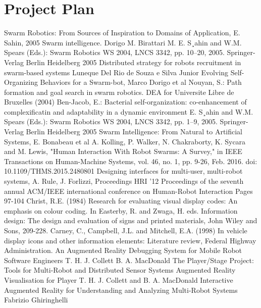 \documentclass[titlepage,hidelinks,10pt]{article}
\begin{document}
\section{Project Plan}
\begin{thebibliography}{1}
 Swarm Robotics: From Sources of
Inspiration to Domains of Application, E. Sahin, 2005
 Swarm intelligence. Dorigo M. Birattari M.
 E. S¸ahin and W.M. Spears (Eds.): Swarm Robotics WS 2004, LNCS 3342, pp. 10–20, 2005. Springer-Verlag Berlin Heidelberg 2005
 Distributed strategy for robots recruitment in swarm-based systems Luneque Del Rio de Souza e Silva Junior
 Evolving Self-Organizing Behaviors for a Swarm-bot, Marco Dorigo et al
 Nouyan, S.: Path formation and goal search in swarm robotics. DEA for Universite Libre de Bruxelles (2004)
 Ben-Jacob, E.: Bacterial self-organization: co-enhancement of complexificatin and
adaptability in a dynamic environment
 E. S¸ahin and W.M. Spears (Eds.): Swarm Robotics WS 2004, LNCS 3342, pp. 1–9, 2005. Springer-Verlag Berlin Heidelberg 2005
 Swarm Intelligence: From Natural to Artificial Systems, E. Bonabeau et al
 A. Kolling, P. Walker, N. Chakraborty, K. Sycara and M. Lewis, "Human Interaction With Robot Swarms: A Survey," in IEEE Transactions on Human-Machine Systems, vol. 46, no. 1, pp. 9-26, Feb. 2016. doi: 10.1109/THMS.2015.2480801
 Designing interfaces for multi-user, multi-robot systems, A. Rule, J. Forlizzi, Proceedings HRI '12 Proceedings of the seventh annual ACM/IEEE international conference on Human-Robot Interaction Pages 97-104 
 Christ, R.E. (1984) Research for evaluating visual display codes: An emphasis on colour coding. In Easterby, R. and Zwaga, H. eds. Information design: The design and evaluation of signs and printed materials, John Wiley and Sons, 209-228.
 Carney, C., Campbell, J.L. and Mitchell, E.A. (1998) In vehicle display icons and other information elements: Literature review, Federal Highway Administration.
 An Augmented Reality Debugging System for Mobile Robot Software Engineers T. H. J. Collett B. A. MacDonald
 The Player/Stage Project: Tools for Multi-Robot and Distributed Sensor Systems
 Augmented Reality Visualisation for Player T. H. J. Collett and B. A. MacDonald
 Interactive Augmented Reality for Understanding and Analyzing Multi-Robot Systems Fabrizio Ghiringhelli
\end{thebibliography}

\end{document}
